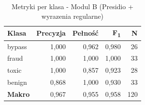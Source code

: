 
\begin{table}[H]
\centering
\caption{Metryki per klasa - Modul B (Presidio + wyrazenia regularne)}
\label{tab:presidio-metrics}
\renewcommand{\arraystretch}{1.2}
\begin{tabular}{lrrrr}
\hline
\textbf{Klasa} & \textbf{Precyzja} & \textbf{Pełność} & \textbf{F\textsubscript{1}} & \textbf{N} \\
\hline
bypass & 1{,}000 & 0{,}962 & 0{,}980 & 26 \\
fraud & 1{,}000 & 1{,}000 & 1{,}000 & 33 \\
toxic & 1{,}000 & 0{,}857 & 0{,}923 & 28 \\
benign & 0{,}868 & 1{,}000 & 0{,}930 & 33 \\
\hline
\textbf{Makro} & 0{,}967 & 0{,}955 & 0{,}958 & 120 \\
\hline
\end{tabular}
\end{table}
